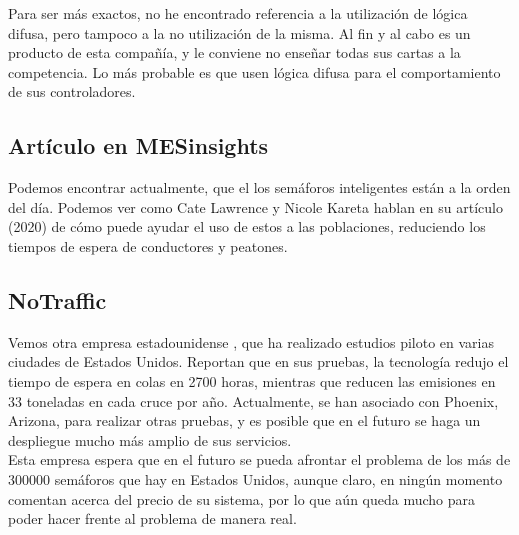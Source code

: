 Para ser más exactos, no he encontrado referencia a la utilización de lógica difusa, pero tampoco a la no utilización de la misma. Al fin y al cabo es un producto de esta compañía, y le conviene no enseñar todas sus cartas a la competencia. Lo más probable es que usen lógica difusa para el comportamiento de sus controladores.

\subsection{Artículo en MESinsights}

Podemos encontrar actualmente, que el los semáforos inteligentes están a la orden del día. Podemos ver como 
Cate Lawrence y Nicole Kareta hablan en su artículo \cite{MES} (2020) de cómo puede ayudar el uso de estos a las poblaciones, reduciendo los tiempos de espera de conductores y peatones.

\subsection{NoTraffic}

Vemos otra empresa estadounidense \cite{NT, NT2}, que ha realizado estudios piloto en varias ciudades de Estados Unidos. Reportan que en sus pruebas, la tecnología redujo el tiempo de espera en colas en 2700 horas, mientras que reducen las emisiones en 33 toneladas en cada cruce por año. Actualmente, se han asociado con Phoenix, Arizona, para realizar otras pruebas, y es posible que en el futuro se haga un despliegue mucho más amplio de sus servicios.\\

Esta empresa espera que en el futuro se pueda afrontar el problema de los más de 300000 semáforos que hay en Estados Unidos, aunque claro, en ningún momento comentan acerca del precio de su sistema, por lo que aún queda mucho para poder hacer frente al problema de manera real.

\newpage

